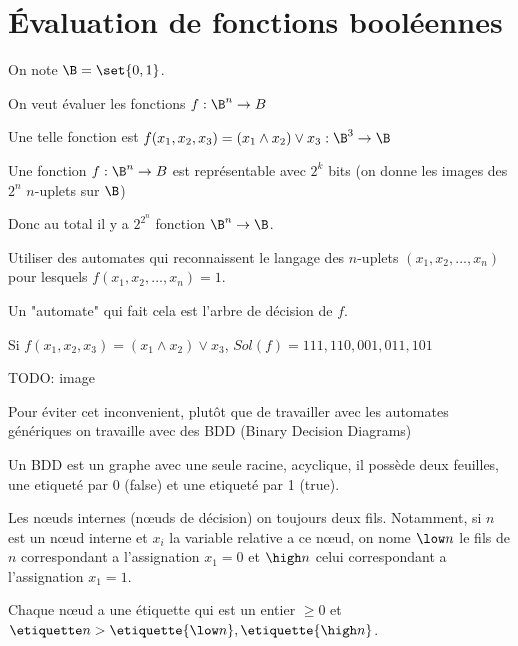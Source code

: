 \section{Évaluation de fonctions booléennes}

\begin{notation}
	On note $\B = \set {0,1}$.
\end{notation}

On veut évaluer les fonctions $f : \B ^ n \to B$

\begin{exemple}
	Une telle fonction est $f(x_1,x_2,x_3) = (x_1 \land x_2) \lor x_3 : \B^3 \to \B$
\end{exemple}

Une fonction $f : \B ^ n \to B$ est représentable avec $2^k$ bits
(on donne les images des $2^n$ $n$-uplets sur $\B$)

Donc au total il y a $2^{2^n}$ fonction $\B^n \to \B$.

\begin{idee}
	Utiliser des automates qui reconnaissent le langage des $n$-uplets
	$(x_1,x_2,\ldots, x_n)$ pour lesquels $f(x_1, x_2, \ldots, x_n) = 1$.
\end{idee}

Un "automate" qui fait cela est l'arbre de décision de $f$.

\begin{exemple}
	Si $f(x_1,x_2,x_3) = (x_1 \land x_2) \lor x_3$, $Sol(f) = 111,110,001,011,101$

	TODO: image
\end{exemple}


Pour éviter cet inconvenient, plutôt que de travailler avec les automates génériques
on travaille avec des BDD (Binary Decision Diagrams)

\begin{definition}
	Un BDD est un graphe avec une seule racine, acyclique, il possède deux feuilles,
	une etiqueté par 0 (false) et une etiqueté par 1 (true).

	Les nœuds internes (nœuds de décision) on toujours deux fils. Notamment, si $n$ est un nœud interne
	et $x_i$ la variable relative a ce nœud, on nome $\low n$ le fils de $n$ correspondant a l'assignation
	$x_1 = 0$ et $\high n$ celui correspondant a l'assignation $x_1 = 1$.

	Chaque nœud a une étiquette qui est un entier $\geq 0$ et $\etiquette n > \etiquette {\low n},  \etiquette {\high n}$.
\end{definition}


